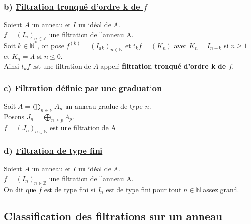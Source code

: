 \subsubsection{b) \underline{Filtration tronqué d'ordre k de $f$}}
\begin{madefinition}
	Soient $A$ un anneau et $I$ un idéal de A.\\
	$f = (I_n)_{n\in \mathbb{Z}}$ une filtration de l'anneau A.\\
	Soit $k \in \mathbb{N}^{*}$, on pose $f^{(k)} = (I_{nk})_{n\in \mathbb{N}}$ et $t_{k}f=(K_n)$ avec $K_n = I_{n+k}$ si $n \geqslant 1 $ et $K_n = A$ si $n \leqslant 0$.\\
	Ainsi $t_{k}f$ est une filtration de $A$ appelé \textbf{filtration tronqué d'ordre k de $f$}.
\end{madefinition}

\subsubsection{c) \underline{Filtration définie par une graduation}}
\begin{madefinition}
	Soit $A = \displaystyle \bigoplus_{n \in \mathbb{N}}{A_n}$ un anneau gradué de type $n$.\\ Posons $J_n = \displaystyle \bigoplus_{n \geqslant p }{A_p}$.\\
	$f=(J_n)_{n \in \mathbb{N}}$ est une filtration de A. 
\end{madefinition}
\subsubsection{d) \underline{Filtration de type fini}}
\begin{madefinition}
	Soient $A$ un anneau et $I$ un idéal de A.\\
	$f = (I_n)_{n\in \mathbb{Z}}$ une filtration de l'anneau A.\\
	On dit que $f$ est de type fini si $I_n$ est de type fini pour tout $n \in \mathbb{N}$ assez grand.
\end{madefinition}

\subsection{Classification des filtrations sur un anneau}
